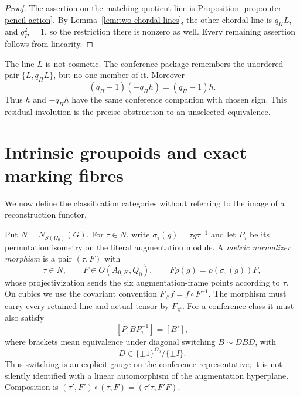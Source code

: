 \documentclass[11pt]{article}
\theoremstyle{definition}
\theoremstyle{remark}
\begin{document}
\begin{proof}
The assertion on the matching-quotient line is Proposition
\ref{prop:outer-pencil-action}.  By Lemma~\ref{lem:two-chordal-lines}, the
other chordal line is \(q_\Pi L\), and
\(q_\Pi^2=1\), so the restriction there is nonzero as well.  Every remaining
assertion follows from linearity.
\end{proof}

The line \(L\) is not cosmetic.  The conference package remembers the
unordered pair \(\{L,q_\Pi L\}\), but no one member of it.  Moreover
\[
       (q_\Pi-1)(-q_\Pi h)=(q_\Pi-1)h.
\]
Thus \(h\) and \(-q_\Pi h\) have the same conference companion with chosen sign.
This residual involution is the precise obstruction to an unselected
equivalence.

\section{Intrinsic groupoids and exact marking fibres}
\label{sec:groupoids}

We now define the classification categories without referring to the image
of a reconstruction functor.

Put \(N=N_{S(\Omega_0)}(G)\).  For \(\tau\in N\), write
\(\sigma_\tau(g)=\tau g\tau^{-1}\) and let \(P_\tau\) be its permutation
isometry on the literal augmentation module.  A \emph{metric normalizer
morphism} is a pair \((\tau,F)\) with
\[
 \tau\in N,\qquad F\in O(A_{0,K},Q_0),\qquad
 F\rho(g)=\rho(\sigma_\tau(g))F,
\]
whose projectivization sends the six augmentation-frame points according to
\(\tau\).  On cubics we use the covariant convention
\(F_\#f=f\circ F^{-1}\).  The morphism must carry every retained line and
actual tensor by \(F_\#\).  For a conference class it must also satisfy
\[
                    [P_\tau BP_\tau^{-1}]=[B'],
\]
where brackets mean equivalence under diagonal switching
\(B\sim DBD\), with
\[
                  D\in\{\pm1\}^{\Omega_0}/\{\pm I\}.
\]
Thus switching
is an explicit gauge on the conference representative; it is not silently
identified with a linear automorphism of the augmentation hyperplane.
Composition is \((\tau',F')\circ(\tau,F)=(\tau'\tau,F'F)\).
\end{document}
